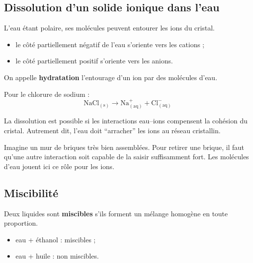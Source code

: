 \documentclass[11pt,a4paper]{article}
\begin{document}
\subsection{Dissolution d’un solide ionique dans l’eau}

L’eau étant polaire, ses molécules peuvent entourer les ions du cristal.

\begin{itemize}
    \item le côté partiellement négatif de l’eau s’oriente vers les cations ;
    \item le côté partiellement positif s’oriente vers les anions.
\end{itemize}

\begin{definitionbox}
On appelle \textbf{hydratation} l’entourage d’un ion par des molécules d’eau.
\end{definitionbox}

\begin{exemplebox}
Pour le chlorure de sodium :
\[
\mathrm{NaCl_{(s)} \rightarrow Na^+_{(aq)} + Cl^-_{(aq)}}
\]
\end{exemplebox}

\begin{comprendrebox}
La dissolution est possible si les interactions eau--ions compensent la cohésion du cristal.  
Autrement dit, l’eau doit ``arracher'' les ions au réseau cristallin.
\end{comprendrebox}

\begin{analogebox}
Imagine un mur de briques très bien assemblées.  
Pour retirer une brique, il faut qu’une autre interaction soit capable de la saisir suffisamment fort.  
Les molécules d’eau jouent ici ce rôle pour les ions.
\end{analogebox}

\subsection{Miscibilité}

\begin{definitionbox}
Deux liquides sont \textbf{miscibles} s’ils forment un mélange homogène en toute proportion.
\end{definitionbox}

\begin{exemplebox}
\begin{itemize}
    \item eau + éthanol : miscibles ;
    \item eau + huile : non miscibles.
\end{itemize}
\end{exemplebox}
\end{document}

